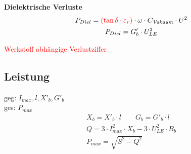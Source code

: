 \textbf{Dielektrische Verluste}
\begin{gather*}
    P_{Diel} = \textcolor{red}{(\tan \delta \cdot \varepsilon_{r})} \cdot \omega \cdot C_{\mathit{Vakuum}} \cdot U^2\\
    P_{Diel} = G'_b\cdot U^2_{LE}
\end{gather*}

\textcolor{red}{Werkstoff abhängige Verlustziffer}

\subsection{Leistung}
geg: $I_{max}, l, X'_b, G'_b$\\
\indent ges: $P_{max}$
\begin{gather*}
    X_b = X'_b \cdot l \qquad G_b = G'_b \cdot l \\
    Q = 3 \cdot I^2_{max} \cdot X_b - 3 \cdot U^2_{LE} \cdot B_b\\
    P_{max} = \sqrt{S^2-Q^2}
\end{gather*}
